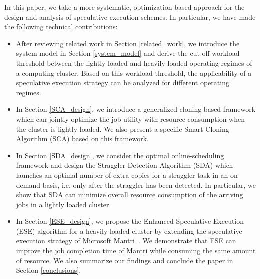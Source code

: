 \documentclass[10pt,conference]{IEEEtran}
\begin{document}
In this paper, we take a more systematic, optimization-based approach for the design and analysis of speculative execution schemes. In particular, we have made the following technical contributions:
\begin{itemize}
\item After reviewing related work in Section \ref{related_work}, we introduce the system model in Section \ref{system_model} and derive the cut-off workload threshold between the
lightly-loaded and heavily-loaded operating regimes of a computing cluster. Based on this workload threshold,
the applicability of a speculative execution strategy can be analyzed for different operating regimes.

\item In Section \ref{SCA_design}, we introduce a generalized cloning-based framework which can jointly optimize the job utility with resource consumption when the cluster is lightly loaded. We also present a specific Smart Cloning Algorithm (SCA) based on this framework.

\item In Section \ref{SDA_design}, we consider the optimal online-scheduling framework and design the Straggler Detection Algorithm (SDA)  which launches an optimal number of extra copies for a straggler task in an on-demand basis, i.e. only after the straggler has been detected. In particular, we show that SDA can minimize overall resource consumption of the arriving jobs in a lightly loaded cluster.

\item In Section \ref{ESE_design}, we propose the Enhanced Speculative Execution (ESE) algorithm for a heavily loaded cluster by extending the speculative execution strategy of Microsoft Mantri~\cite{Outliers}. We demonstrate
that ESE can improve the job completion time of Mantri while consuming the same amount of resource. We also summarize our findings and conclude the paper in Section \ref{conclusions}.

\end{itemize}
\end{document}

